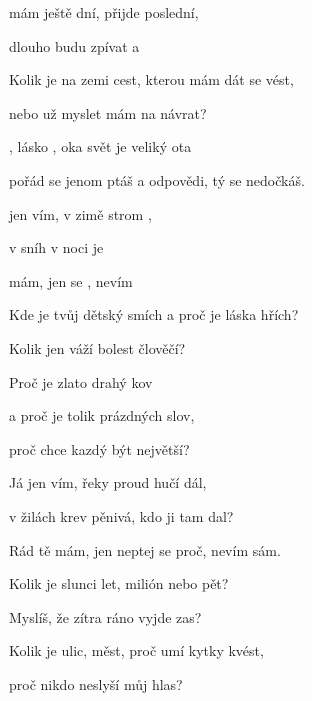 


       

\zs
{} mám ještě {dní},  přijde poslední,

dlouho budu zpívat a 

Kolik je na zemi cest, kterou mám dát se vést,

nebo už myslet mám na návrat?
\ks

\zr
{}, lásko , oka
 svět je veliký ota

pořád se jenom ptáš a odpovědi, tý se nedočkáš.
\kr

\zr
{} jen vím, v zimě strom ,

v  sníh  v noci je 

 mám,
jen  se , nevím 
\kr

       

\zs
Kde je tvůj dětský smích a proč je láska hřích?

Kolik jen váží bolest člověčí?

Proč je zlato drahý kov

a proč je tolik prázdných slov,

proč chce kazdý být největší?
\ks

\zr  \kr

\zr
Já jen vím, řeky proud hučí dál,

v žilách krev pěnivá, kdo ji tam dal?

Rád tě mám, jen neptej se proč, nevím sám.
\kr

\zs
Kolik je slunci let, milión nebo pět?

Myslíš, že zítra ráno vyjde zas?

Kolik je ulic, měst, proč umí kytky kvést,

proč nikdo neslyší můj hlas?
\ks

\kp





